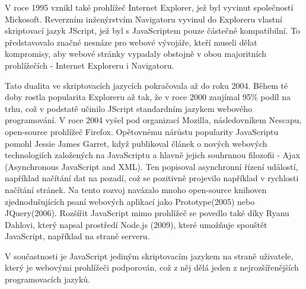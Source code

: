 \documentclass[main.tex]{subfiles}
\begin{document}
V roce 1995 vznikl také prohlížeč Internet Explorer, jež byl vyvinut společností Mickosoft. Reverzním inženýrstvím Navigatoru vyvinul do Exploreru vlastní skriptovací jazyk JScript, jež byl s JavaScriptem pouze částečně kompatibilní. To představovalo značné nesnáze pro webové vývojáře, kteří museli dělat kompromisy, aby webové stránky vypadaly obstojně v obou majoritních prohlížečích - Internet Exploreru i Navigatoru. 

Tato dualita ve skriptovacích jazycích pokračovala až do roku 2004. Během té doby rostla popularita Exploreru až tak, že v roce 2000 zaujímal 95\% podíl na trhu, což v podstatě učinilo JScript standardním jazykem webového programování. V roce 2004 vyšel pod organizací Mozilla, následovníkem Nescapu, open-source prohlížeč Firefox. 
Opětovnému nárůstu popularity JavaScriptu pomohl Jessie James Garret, když publikoval článek o nových webových technologiích založených na JavaScriptu a hlavně jejich souhrnnou filozofii - Ajax (Asynchronous JavaScript and XML). Ten popisoval asynchronní řízení událostí, například načítání dat na pozadí, což se pozitivně projevilo například v rychlosti načítání stránek. Na tento rozvoj navázalo mnoho open-source knihoven zjednodušujících psaní webových aplikací jako Prototype(2005) nebo JQuery(2006).
Rozšířit JavaScript mimo prohlížeč se povedlo také díky Ryanu Dahlovi, který napsal prostředí Node.js (2009), které umožňuje spouštět JavaScript, například na straně serveru.

V součastnosti je JavaScript jediným skriptovacím jazykem na straně uživatele, který je webovými prohlížeči podporován, což z něj dělá jeden z nejrozšířenějších programovacích jazyků.

\end{document}
